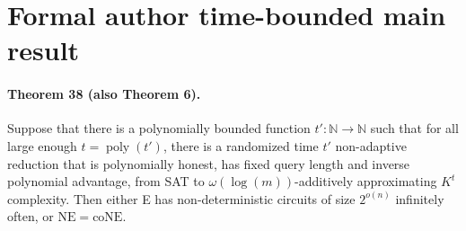 \section*{Formal author time-bounded main result}
\paragraph{Theorem 38 (also Theorem 6).} Suppose that there is a polynomially bounded function $t':\mathbb N\to\mathbb N$ such that for all large enough $t=\operatorname{poly}(t')$, there is a randomized time $t'$ non-adaptive reduction that is polynomially honest, has fixed query length and inverse polynomial advantage, from SAT to $\omega(\log(m))$-additively approximating $K^t$ complexity. Then either E has non-deterministic circuits of size $2^{o(n)}$ infinitely often, or $\mathrm{NE}=\mathrm{coNE}$.
